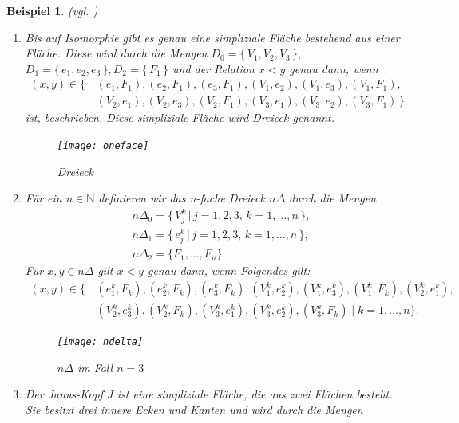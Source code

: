 \documentclass[12pt,titlepage,twoside,cleardoublepage]{article}
\theoremstyle{nummermitklammern}
\newtheorem{bsp}[temp]{Beispiel}
\newtheorem{bsp}[zahl]{Beispiel}
\numberwithin{equation}{section}
\begin{document}
 \begin{bsp}{\textsc{(}vgl. \textsc{\cite{Rey})}}\label{bspsimp}
 \begin{enumerate}
\item 
 Bis auf Isomorphie gibt es genau eine simpliziale Fläche bestehend aus einer Fläche. Diese wird durch die Mengen $
D_{0}=\{\,V_{1},V_{2},V_{3}\,\},$  $D_{1}=\{\,e_{1},e_{2},e_{3}\,\}, D_{2}=\{\,F_{1}\,\}$  und der Relation $x<y$ genau dann, wenn
\begin{align*}
 (x,y)\in \{\,&(e_{1},F_{1}),(e_{2},F_{1}),(e_{3},F_{1}),(V_{1},e_{2}),(V_{1},e_{3}),(V_{1},F_{1}),\\ &(V_{2},e_{1}), (V_{2},e_{3}),(V_{2},F_{1}),
 (V_{3},e_{1}),(V_{3},e_{2}),(V_{3},F_{1})\,\} 
\end{align*} 
ist, beschrieben. Diese simpliziale Fläche wird \emph{Dreieck} genannt. 
\begin{figure}[H]
\begin{center}
\texttt{[image: oneface]}
\end{center}
\caption{Dreieck}
\end{figure}
 \item
 Für ein $n \in \mathbb{N}$ definieren wir das \emph{n-fache Dreieck} $n \Delta$ durch die Mengen 
 \begin{align*}
  &n\Delta_0=\{ \,V_{j}^{k}\,\vert\, j=1,2,3,\,k=1,\ldots,n\,\},\\
   &n\Delta_1=\{\,e_{j}^{k}\,\vert\, j=1,2,3,\,k=1,\ldots,n\,\},\\
   &n\Delta_2=\{F_{1},\ldots,F_{n}\} .
   \end{align*}
   Für $x,y\in n\Delta$ gilt $x<y$ genau dann, wenn Folgendes gilt:
   \begin{align*}
 (x,y)\in \{\,&(e_{1}^k,F_{k}),(e_{2}^k,F_{k}),(e_{3}^k,F_{k}),(V_{1}^k,e_{2}^k),(V_{1}^k,e_{3}^k),(V_{1}^k,F_{k}), (V_{2}^k,e_{1}^k),\\ &(V_{2}^k,e_{3}^k),(V_{2}^k,F_{k}),(V_{3}^k,e_{1}^k),(V_{3}^k,e_{2}^k),(V_{3}^k,F_{k})\mid k=1,\ldots,n\} .
\end{align*}
 \begin{figure}[H]
\begin{center}
\texttt{[image: ndelta]}
\end{center}
\caption{$n\Delta$ im Fall $n=3$}
\end{figure}
 \item 
 Der \emph{Janus-Kopf} $J$ ist eine simpliziale Fläche, die aus zwei Flächen besteht. Sie besitzt drei innere Ecken und Kanten und wird durch die Mengen

\end{enumerate}
\end{bsp}
\end{document}
